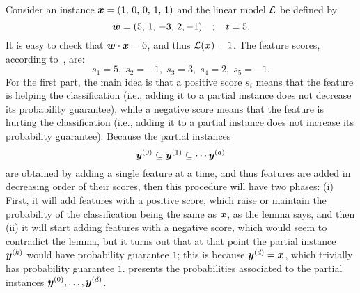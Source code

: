 \begin{example}\label{ex:greedy}
 Consider an instance ${\bm{x}} = (1,\, 0, \, 0, \, 1, \, 1)$ and the linear model $\mathcal{L}$ be defined by 
 \[ 
    {\bm{w}} = (5, \, 1, \, -3,\, 2, -1) \quad ; \quad t = 5.
 \]
 It is easy to check that ${\bm{w}} \cdot {\bm{x}} = 6$, and thus $\mathcal{L}({\bm{x}}) = 1$. The feature scores, according to~, are:
 \[
  s_1 = 5, \; s_2 = -1, \; s_3 = 3, \; s_4 = 2, \; s_5 = -1.
 \]
For the first part, the main idea is that a positive score $s_i$ means that the feature is helping the classification (i.e., adding it to a partial instance does not decrease its probability guarantee), while a negative score means that the feature is hurting the classification (i.e., adding it to a partial instance does not increase its probability guarantee). 
Because the partial instances 
\[ {\bm{y}}^{(0)} \subseteq {\bm{y}}^{(1)} \subseteq \cdots {\bm{y}}^{(d)}
\] 
are obtained by adding a single feature at a time, and thus features are added in decreasing order of their scores, then this procedure will have two phases: (i) First, it will add features with a positive score, which raise or maintain the probability of the classification being the same as ${\bm{x}}$, as the lemma says, and then (ii) it will start adding features with a negative score, which would seem to contradict the lemma, but it turns out that at that point the partial instance ${\bm{y}}^{(k)}$ would have probability guarantee $1$; this is because ${\bm{y}}^{(d)} = {\bm{x}}$, which trivially has probability guarantee $1$.
 presents the probabilities associated to the partial instances ${\bm{y}}^{(0)}, \ldots, {\bm{y}}^{(d)}$.


\end{example}
